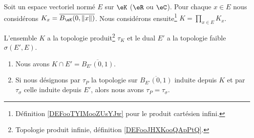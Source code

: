 \begin{lemma}	\label{LEMooWBIBooOFElVy}
	Soit un espace vectoriel normé \( E\) sur \( \eK\) (\( \eR\) ou \( \eC\)). Pour chaque \( x\in E\) nous considérons \(K_x=\overline{B_{\eK}(0,\| x \|)}\). Nous considérons ensuite\footnote{Définition \ref{DEFooTYIMooZUsYJw} pour le produit cartésien infini.} \( K=\prod_{x\in E}K_x\).

	L'ensemble \( K\) a la topologie produit\footnote{Topologie produit infinie, définition \ref{DEFooJHXKooQApPtQ}.} \( \tau_K\) et le dual \( E'\) a la topologie faible \( \sigma(E',E)\).

	\begin{enumerate}
		\item
		      Nous avons \( K\cap E'=\overline{B_{E'}(0,1)}\).
		\item
		      Si nous désignons par \( \tau_P\) la topologie sur \( \overline{B_{E'}(0,1)}\) induite depuis \( K\) et par \( \tau_{\sigma}\) celle induite depuis \( E'\), alors nous avons \( \tau_P=\tau_{\sigma}\).
	\end{enumerate}
\end{lemma}

